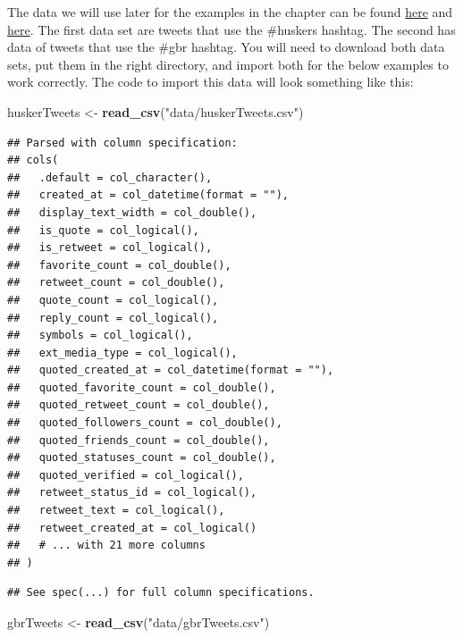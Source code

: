 \documentclass[
]{book}
\newenvironment{Shaded}{\begin{snugshade}}{\end{snugshade}}
\newcommand{\KeywordTok}[1]{\textcolor[rgb]{0.13,0.29,0.53}{\textbf{#1}}}
\newcommand{\NormalTok}[1]{#1}
\newcommand{\StringTok}[1]{\textcolor[rgb]{0.31,0.60,0.02}{#1}}
\begin{document}
The data we will use later for the examples in the chapter can be found \href{https://unl.box.com/s/x4jjifc394gxfvsvbwb3csez2ne4l4rb}{here} and \href{https://unl.box.com/s/s4ej8khwi9ah9qvqpi2jviqomfocie3n}{here}. The first data set are tweets that use the \#huskers hashtag. The second has data of tweets that use the \#gbr hashtag. You will need to download both data sets, put them in the right directory, and import both for the below examples to work correctly. The code to import this data will look something like this:

\begin{Shaded}
\begin{Highlighting}[]
\NormalTok{huskerTweets <-}\StringTok{ }\KeywordTok{read_csv}\NormalTok{(}\StringTok{"data/huskerTweets.csv"}\NormalTok{)}
\end{Highlighting}
\end{Shaded}

\begin{verbatim}
## Parsed with column specification:
## cols(
##   .default = col_character(),
##   created_at = col_datetime(format = ""),
##   display_text_width = col_double(),
##   is_quote = col_logical(),
##   is_retweet = col_logical(),
##   favorite_count = col_double(),
##   retweet_count = col_double(),
##   quote_count = col_logical(),
##   reply_count = col_logical(),
##   symbols = col_logical(),
##   ext_media_type = col_logical(),
##   quoted_created_at = col_datetime(format = ""),
##   quoted_favorite_count = col_double(),
##   quoted_retweet_count = col_double(),
##   quoted_followers_count = col_double(),
##   quoted_friends_count = col_double(),
##   quoted_statuses_count = col_double(),
##   quoted_verified = col_logical(),
##   retweet_status_id = col_logical(),
##   retweet_text = col_logical(),
##   retweet_created_at = col_logical()
##   # ... with 21 more columns
## )
\end{verbatim}

\begin{verbatim}
## See spec(...) for full column specifications.
\end{verbatim}

\begin{Shaded}
\begin{Highlighting}[]
\NormalTok{gbrTweets <-}\StringTok{ }\KeywordTok{read_csv}\NormalTok{(}\StringTok{"data/gbrTweets.csv"}\NormalTok{)}
\end{Highlighting}
\end{Shaded}
\end{document}
